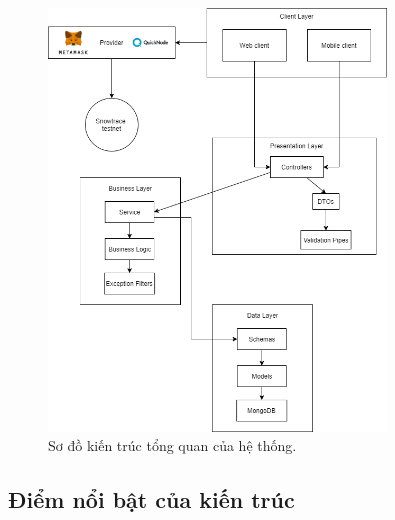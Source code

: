 \begin{figure}[H]
    \centering
    \includegraphics[width=0.8\textwidth]{figures/c2/ArchitectureOverall.png}
    \caption{Sơ đồ kiến trúc tổng quan của hệ thống.}
    \label{fig:architecture-diagram}
\end{figure}

\subsection{Điểm nổi bật của kiến trúc}

